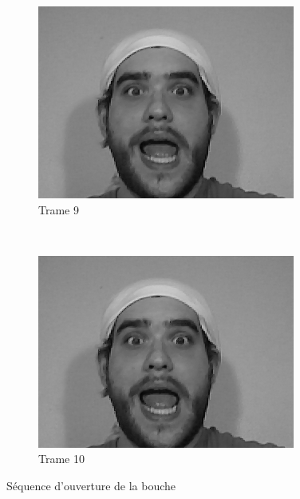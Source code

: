 \documentclass[compress,pdf,11pt,xcolor=dvipsnames]{beamer}
\begin{document}
\begin{frame}{}
\begin{figure}[ht!]
        \centering
        \begin{subfigure}[b]{0.5\textwidth}
                \centering
                \includegraphics[width=\textwidth]{img/f9}
                \caption{Trame 9}
                \label{fig:trame9}
        \end{subfigure}%
        ~ %
        \begin{subfigure}[b]{0.5\textwidth}
                \centering
                \includegraphics[width=\textwidth]{img/f10}
                \caption{Trame 10}
                \label{fig:trame10}
        \end{subfigure}
        \caption{Séquence d'ouverture de la bouche}
        \label{fig:trames910}
\end{figure}
\end{frame}{}
\end{document}
